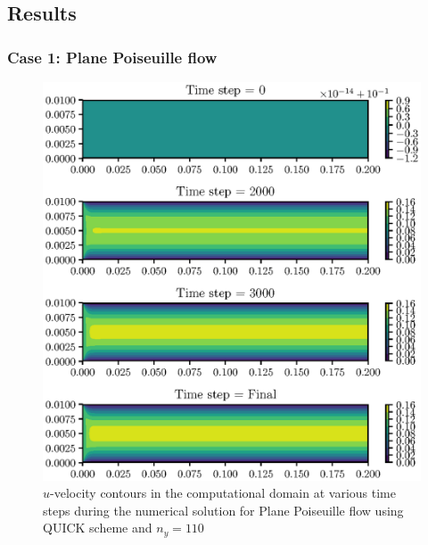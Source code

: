 \documentclass[12pt,a4paper,fleqn]{article}
\begin{document}
\subsection{Results}
\subsubsection{Case 1: Plane Poiseuille flow}
\begin{figure}[H]
  \centering
  \includegraphics[width=\linewidth]{navierFVD-UvelocityContours.eps}
  \caption{$u$-velocity contours in the computational domain at various time steps during the numerical solution for Plane Poiseuille flow using QUICK scheme and $n_y = 110$}
\end{figure}
\end{document}
